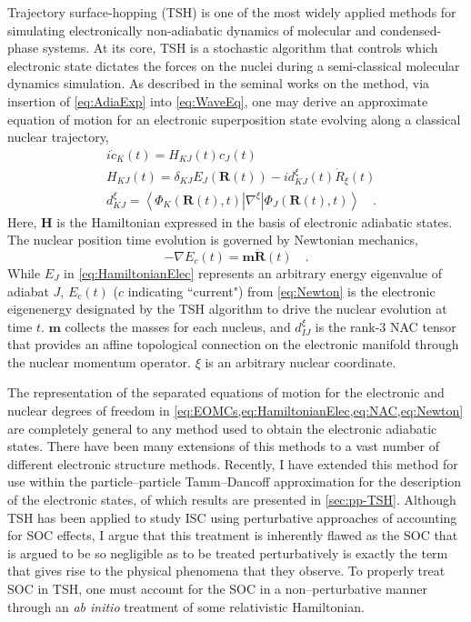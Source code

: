 \documentclass[12pt]{article}
\newcommand{\innerop}[3]{\left\langle #1 \left\vert #2 \right\vert #3 \right\rangle}  %
\newcommand*\vc[1]{\boldsymbol{#1}}
\begin{document}
Trajectory surface-hopping (TSH) is one of the most widely applied methods for
simulating electronically non-adiabatic dynamics of molecular and
condensed-phase systems.\cite{Barbatti11_1759, Tavernelli14_62, Tully12_22A301,
Tully98_407, Hynes14_97} At its core, TSH is a stochastic algorithm that
controls which electronic state dictates the forces on the nuclei during a
semi-classical molecular dynamics simulation.\cite{Preston71_562} As described in
the seminal works on the method\cite{Tully98_407, Tully90_1061}, via insertion
of \cref{eq:AdiaExp} into \cref{eq:WaveEq}, one may derive an approximate
equation of motion for an electronic superposition state evolving along a
classical nuclear trajectory,
\begin{align}
  &i  \dot{c}_K(t) = H_{KJ}(t) c_J(t) \label{eq:EOMCs} \\
  &H_{KJ}(t) = \delta_{KJ}E_J(\vc{R}(t)) - i d_{KJ}^\xi (t) \dot{R}_{\xi}(t) \label{eq:HamiltonianElec} \\
  &d_{KJ}^\xi = \innerop{\Phi_K(\vc{R}(t),t)}{\nabla^\xi}{\Phi_J(\vc{R}(t),t)} \label{eq:NAC}
  \quad .
\end{align}
Here, $\vc{H}$ is the Hamiltonian expressed in the basis of electronic adiabatic
states. The nuclear position time evolution is governed by Newtonian mechanics,
\begin{equation}
  -\nabla E_c(t) = \vc{m}\ddot{\vc{R}}(t) \label{eq:Newton}
  \quad.
\end{equation}
While $E_J$ in \cref{eq:HamiltonianElec} represents an arbitrary energy
eigenvalue of adiabat $J$, $E_c(t)$ ($c$ indicating ``current") from
\cref{eq:Newton} is the electronic eigenenergy designated by the TSH algorithm
to drive the nuclear evolution at time $t$.  $\vc{m}$ collects the masses for
each nucleus, and $d_{IJ}^\xi$ is the rank-3 NAC tensor that provides an affine
topological connection on the electronic manifold through the nuclear momentum
operator. $\xi$ is an arbitrary nuclear coordinate.

The representation of the separated equations of motion for the electronic and
nuclear degrees of freedom in
\cref{eq:EOMCs,eq:HamiltonianElec,eq:NAC,eq:Newton} are completely general to
any method used to obtain the electronic adiabatic states. There have been many
extensions of this methods to a vast number of different electronic structure
methods. Recently, I have extended this method for use within the
particle--particle Tamm--Dancoff approximation for the description of the
electronic states\cite{DBWY16_Submitted1}, of which results are presented in
\cref{sec:pp-TSH}. Although TSH has been applied to study ISC using perturbative
approaches of accounting for SOC effects, I argue that this treatment is
inherently flawed as the SOC that is argued to be so negligible as to be
treated perturbatively is exactly the term that gives rise to the physical
phenomena that they observe. To properly treat SOC in TSH, one must account for
the SOC in a non--perturbative manner through an \emph{ab initio} treatment of
some relativistic Hamiltonian.
\end{document}
